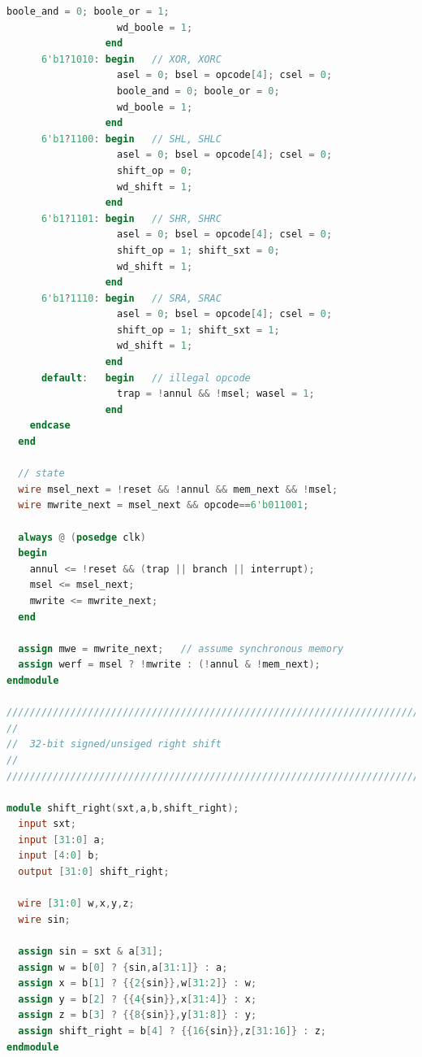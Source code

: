 \documentclass{article}
\begin{document}
\begin{lstlisting}[language=Verilog]
                   boole_and = 0; boole_or = 1;
                   wd_boole = 1;
                 end
      6'b1?1010: begin   // XOR, XORC
                   asel = 0; bsel = opcode[4]; csel = 0;
                   boole_and = 0; boole_or = 0;
                   wd_boole = 1;
                 end
      6'b1?1100: begin   // SHL, SHLC
                   asel = 0; bsel = opcode[4]; csel = 0;
                   shift_op = 0;
                   wd_shift = 1;
                 end
      6'b1?1101: begin   // SHR, SHRC
                   asel = 0; bsel = opcode[4]; csel = 0;
                   shift_op = 1; shift_sxt = 0;
                   wd_shift = 1;
                 end
      6'b1?1110: begin   // SRA, SRAC
                   asel = 0; bsel = opcode[4]; csel = 0;
                   shift_op = 1; shift_sxt = 1;
                   wd_shift = 1;
                 end
      default:   begin   // illegal opcode
                   trap = !annul && !msel; wasel = 1;
                 end
    endcase
  end

  // state
  wire msel_next = !reset && !annul && mem_next && !msel;
  wire mwrite_next = msel_next && opcode==6'b011001;
 
  always @ (posedge clk)
  begin
    annul <= !reset && (trap || branch || interrupt);
    msel <= msel_next;
    mwrite <= mwrite_next;
  end

  assign mwe = mwrite_next;   // assume synchronous memory
  assign werf = msel ? !mwrite : (!annul & !mem_next);
endmodule

///////////////////////////////////////////////////////////////////////////////
//
//	32-bit signed/unsiged right shift
//
///////////////////////////////////////////////////////////////////////////////

module shift_right(sxt,a,b,shift_right);
  input sxt;
  input [31:0] a;
  input [4:0] b;
  output [31:0] shift_right;

  wire [31:0] w,x,y,z;
  wire sin;

  assign sin = sxt & a[31];
  assign w = b[0] ? {sin,a[31:1]} : a;
  assign x = b[1] ? {{2{sin}},w[31:2]} : w;
  assign y = b[2] ? {{4{sin}},x[31:4]} : x;
  assign z = b[3] ? {{8{sin}},y[31:8]} : y;
  assign shift_right = b[4] ? {{16{sin}},z[31:16]} : z;
endmodule
\end{lstlisting}
\end{document}
